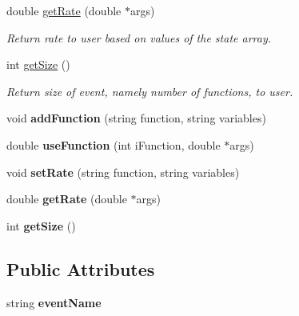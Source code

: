 \begin{DoxyCompactItemize}
double \hyperlink{class_event_a2288e3b3fa19e076e04bba11b88d189a}{get\+Rate} (double $\ast$args)
\begin{DoxyCompactList}\small\item\em Return rate to user based on values of the state array. \end{DoxyCompactList}\item 
int \hyperlink{class_event_a1a0f2e2dc0b203f7be0f1d5b8810c6a2}{get\+Size} ()
\begin{DoxyCompactList}\small\item\em Return size of event, namely number of functions, to user. \end{DoxyCompactList}\item 
\mbox{\label{class_event_ad380e41418d2e34b651e052711fefe83}} 
void {\bfseries add\+Function} (string function, string variables)
\item 
\mbox{\label{class_event_a2637844b7f9583caf0f808c898dc2246}} 
double {\bfseries use\+Function} (int i\+Function, double $\ast$args)
\item 
\mbox{\label{class_event_a993a01984496bc158be92b67422f8655}} 
void {\bfseries set\+Rate} (string function, string variables)
\item 
\mbox{\label{class_event_a2288e3b3fa19e076e04bba11b88d189a}} 
double {\bfseries get\+Rate} (double $\ast$args)
\item 
\mbox{\label{class_event_a1a0f2e2dc0b203f7be0f1d5b8810c6a2}} 
int {\bfseries get\+Size} ()
\end{DoxyCompactItemize}
\subsection*{Public Attributes}
\begin{DoxyCompactItemize}
\item 
\mbox{\label{class_event_acf8fc6215a0eeaa049e2aca9a347f4b0}} 
string {\bfseries event\+Name}
\end{DoxyCompactItemize}
